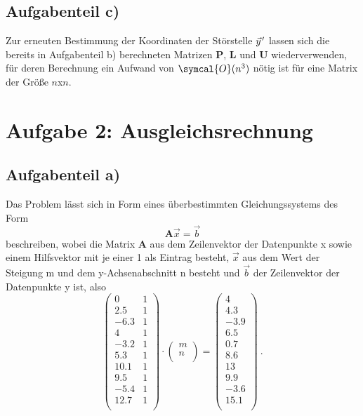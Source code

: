 \subsection*{Aufgabenteil c)}
Zur erneuten Bestimmung der Koordinaten der Störstelle $\pvec{y}'$ lassen sich die bereits
in Aufgabenteil b) berechneten Matrizen $\symbf{P}$, $\symbf{L}$ und $\symbf{U}$ wiederverwenden, für deren Berechnung ein Aufwand von $\symcal{O}(n^3)$ nötig ist für eine Matrix der Größe $n$x$n$.

\section*{Aufgabe 2: Ausgleichsrechnung}
\subsection*{Aufgabenteil a)}
Das Problem lässt sich in Form eines überbestimmten Gleichungssystems des Form
\begin{equation}
  \symbf{A}\vec{x}=\vec{b}
\end{equation}
beschreiben, wobei die Matrix $\symbf{A}$ aus dem Zeilenvektor der Datenpunkte x sowie einem
Hilfsvektor mit je einer 1 als Eintrag besteht, $\vec{x}$ aus dem Wert der Steigung m und dem y-Achsenabschnitt
n besteht und $\vec{b}$ der Zeilenvektor der Datenpunkte y ist, also
\begin{equation}
  \begin{pmatrix}
    0 & 1 \\
    2.5 & 1 \\
    -6.3 & 1 \\
    4 & 1 \\
    -3.2 & 1 \\
    5.3 & 1 \\
    10.1 & 1 \\
    9.5 & 1 \\
    -5.4 & 1 \\
    12.7 & 1 \\
  \end{pmatrix}
  \cdot
  \begin{pmatrix}
    m \\
    n \\
  \end{pmatrix}
  =
  \begin{pmatrix}
    4 \\
    4.3 \\
    -3.9 \\
    6.5 \\
    0.7 \\
    8.6 \\
    13 \\
    9.9 \\
    -3.6 \\
    15.1 \\
  \end{pmatrix} \: .
\end{equation}




